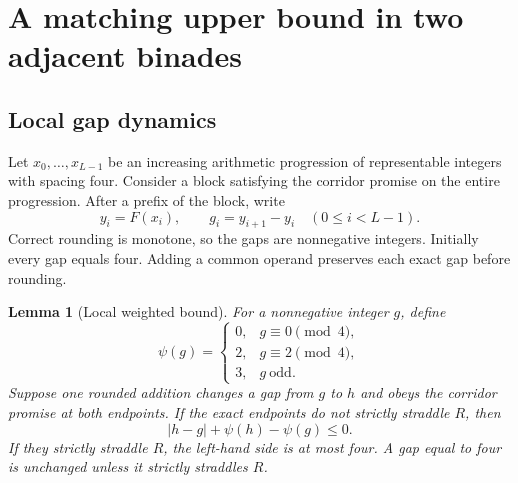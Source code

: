 \documentclass[11pt,reqno]{amsart}
\newtheorem{lemma}[theorem]{Lemma}
\theoremstyle{definition}
\theoremstyle{remark}
\numberwithin{equation}{section}
\begin{document}
\section{A matching upper bound in two adjacent binades}
\label{sec:corridor}

\subsection{Local gap dynamics}

Let $x_0,\ldots,x_{L-1}$ be an increasing arithmetic progression of
representable integers with spacing four. Consider a block satisfying
the corridor promise on the entire progression. After a prefix of the
block, write
\[
 y_i=F(x_i),\qquad g_i=y_{i+1}-y_i\quad(0\leq i<L-1).
\]
Correct rounding is monotone, so the gaps are nonnegative integers.
Initially every gap equals four. Adding a common operand preserves
each exact gap before rounding.

\begin{samepage}
\begin{lemma}[Local weighted bound]
\label{lem:weighted}
For a nonnegative integer $g$, define
\begin{equation}
\label{eq:residue-potential}
 \psi(g)=
 \begin{cases}
  0,&g\equiv 0\pmod 4,\\
  2,&g\equiv 2\pmod 4,\\
  3,&g\ \text{odd}.
 \end{cases}
\end{equation}
Suppose one rounded addition changes a gap from $g$ to $h$ and obeys
the corridor promise at both endpoints. If the exact endpoints do not
strictly straddle $R$, then
\begin{equation}
\label{eq:local-charge}
  |h-g|+\psi(h)-\psi(g)\leq 0.
\end{equation}
If they strictly straddle $R$, the left-hand side is at most four.
A gap equal to four is unchanged unless it strictly straddles $R$.
\end{lemma}
\end{samepage}
\end{document}
